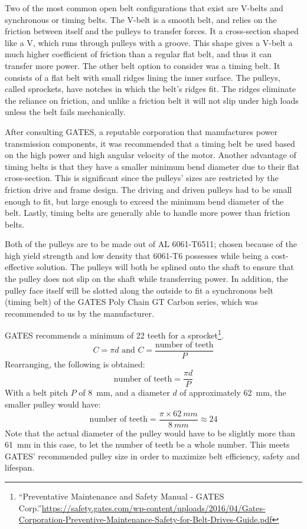 \documentclass[main.tex]{subfiles}
\begin{document}
Two of the most common open belt configurations that exist are V-belts and synchronous or timing belts. The V-belt is a smooth belt, and relies on the friction between itself and the pulleys to transfer forces. It a cross-section shaped like a V, which runs through pulleys with a groove. This shape gives a V-belt a much higher coefficient of friction than a regular flat belt, and thus it can transfer more power. The other belt option to consider was a timing belt. It consists of a flat belt with small ridges lining the inner surface. The pulleys, called sprockets, have notches in which the belt's ridges fit. The ridges eliminate the reliance on friction, and unlike a friction belt it will not slip under high loads unless the belt fails mechanically.

After consulting GATES, a reputable corporation that manufactures power transmission components, it was recommended that a timing belt be used based on the high power and high angular velocity of the motor. Another advantage of timing belts is that they have a smaller minimum bend diameter due to their flat cross-section. This is significant since the pulleys' sizes are restricted by the friction drive and frame design. The driving and driven pulleys had to be small enough to fit, but large enough to exceed the minimum bend diameter of the belt. Lastly, timing belts are generally able to handle more power than friction belts.

Both of the pulleys are to be made out of AL 6061-T6511; chosen because of the high yield strength and low density that 6061-T6 possesses while being a cost-effective solution. The pulleys will both be splined onto the shaft to ensure that the pulley does not slip on the shaft while transferring power. In addition, the pulley face itself will be slotted along the outside to fit a synchronous belt (timing belt) of the GATES Poly Chain GT Carbon series, which was recommended to us by the manufacturer.

GATES recommends a minimum of 22 teeth for a sprocket\footnote{``Preventative Maintenance and Safety Manual - GATES Corp.''\url{https://safety.gates.com/wp-content/uploads/2016/04/Gates-Corporation-Preventive-Maintenance-Safety-for-Belt-Drives-Guide.pdf}}.
\begin{equation}
C = \pi d \textrm{ and } C=\frac{\textrm{number of teeth}}{P}
\end{equation}
Rearranging, the following is obtained:
\begin{equation}
\textrm{number of teeth}=\frac{\pi d}{P}
\end{equation}
With a belt pitch $P$ of \SI{8}{mm}, and a diameter $d$ of approximately \SI{62}{mm}, the smaller pulley would have:
\begin{equation}
\textrm{number of teeth}=\frac{\pi \times \SI{62}{mm}}{\SI{8}{mm}}\approx 24
\end{equation}
Note that the actual diameter of the pulley would have to be slightly more than \SI{61}{mm} in this case, to let the number of teeth be a whole number.
This meets GATES' recommended pulley size in order to maximize belt efficiency, safety and lifespan.
\end{document}
